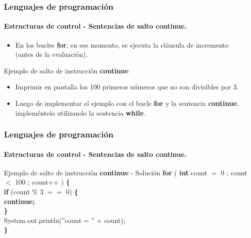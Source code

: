 \documentclass{beamer}
\begin{document}
		\begin{frame}
			\frametitle{Lenguajes de programaci\'on}
			\framesubtitle{Estructuras de control - Sentencias de salto \textbf{continue}.}

			\begin{itemize}
				\item En los bucles \textbf{for}, en ese momento, se ejecuta la cl\'ausula de incremento (antes de la evaluaci\'on).
			\end{itemize}

			\begin{block}{Ejemplo de salto de instrucci\'on \textbf{continue}}
				\begin{itemize}
					\item Imprimir en pantalla los 100 primeros n\'umeros que no son divisibles por 3.
					\item Luego de implementar el ejemplo con el bucle \textbf{for} y la sentencia \textbf{continue}, implem\'entelo utilizando la sentencia \textbf{while}.
				\end{itemize}
			\end{block}
		\end{frame}

		\begin{frame}
			\frametitle{Lenguajes de programaci\'on}
			\framesubtitle{Estructuras de control - Sentencias de salto \textbf{continue}.}

			\begin{block}{Ejemplo de salto de instrucci\'on \textbf{continue} - Soluci\'on}
				{\scriptsize
				\textbf{for} ( \textbf{int} count $=$ 0 ; count $<$ 100 ; count++ ) \textbf{\{} \\
				\hspace{0.3cm} \textbf{if}  (count \% 3 $==$ 0) \textbf{\{} \\
				\hspace{0.6cm} \textbf{continue;} \\
				\hspace{0.3cm}\textbf{\}} \\
				\vspace{0.3cm}
				\hspace{0.3cm} System.out.println(''count = '' + count); \\
				\textbf{\}} 
				}
			\end{block}
		\end{frame}
\end{document}
